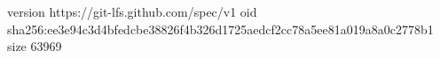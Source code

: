 version https://git-lfs.github.com/spec/v1
oid sha256:ee3e94c3d4bfedcbe38826f4b326d1725aedcf2cc78a5ee81a019a8a0c2778b1
size 63969
